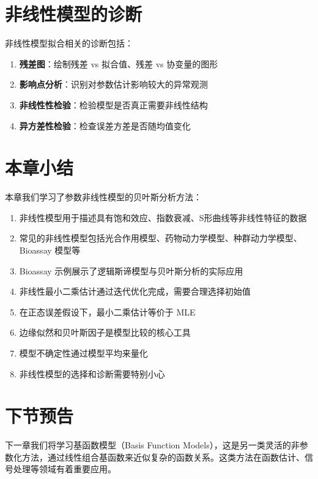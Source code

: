 \section{非线性模型的诊断}

非线性模型拟合相关的诊断包括：

\begin{enumerate}
  \item \textbf{残差图}：绘制残差 vs 拟合值、残差 vs 协变量的图形
  \item \textbf{影响点分析}：识别对参数估计影响较大的异常观测
  \item \textbf{非线性性检验}：检验模型是否真正需要非线性结构
  \item \textbf{异方差性检验}：检查误差方差是否随均值变化
\end{enumerate}

\section{本章小结}

本章我们学习了参数非线性模型的贝叶斯分析方法：

\begin{enumerate}
  \item 非线性模型用于描述具有饱和效应、指数衰减、S形曲线等非线性特征的数据
  \item 常见的非线性模型包括光合作用模型、药物动力学模型、种群动力学模型、Bioassay 模型等
  \item Bioassay 示例展示了逻辑斯谛模型与贝叶斯分析的实际应用
  \item 非线性最小二乘估计通过迭代优化完成，需要合理选择初始值
  \item 在正态误差假设下，最小二乘估计等价于 MLE
  \item 边缘似然和贝叶斯因子是模型比较的核心工具
  \item 模型不确定性通过模型平均来量化
  \item 非线性模型的选择和诊断需要特别小心
\end{enumerate}

\section{下节预告}

下一章我们将学习基函数模型（Basis Function Models），这是另一类灵活的非参数化方法，通过线性组合基函数来近似复杂的函数关系。这类方法在函数估计、信号处理等领域有着重要应用。

\endinput

